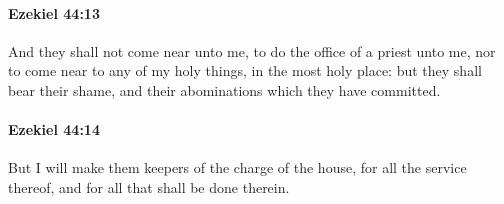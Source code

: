 		\paragraph{Ezekiel 44:13} %
			\label{EZEKIEL-44-13}

			And they shall not come near unto me, to do the office of a priest unto me, nor to come near to any of my holy things, in the most holy place: but they shall bear their shame, and their abominations which they have committed.


		\paragraph{Ezekiel 44:14} %
			\label{EZEKIEL-44-14}

			But I will make them keepers of the charge of the house, for all the service thereof, and for all that shall be done therein.


